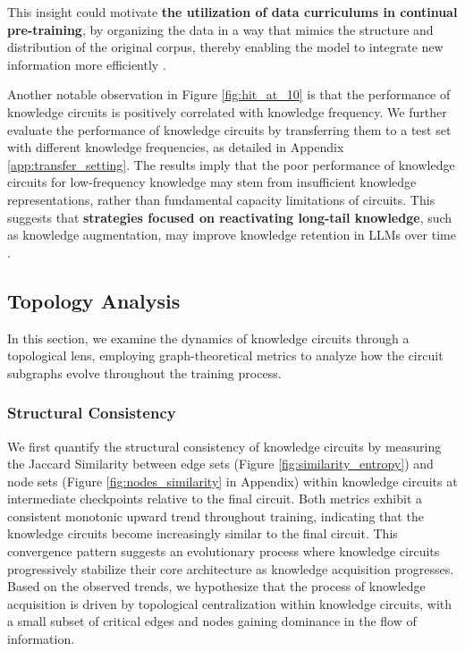 
This insight could motivate \textbf{the utilization of data curriculums in continual pre-training}, by organizing the data in a way that mimics the structure and distribution of the original corpus, thereby enabling the model to integrate new information more efficiently \citep{Yıldız_Ravichandran_Punia_Bethge_Ermis_2024,Parmar_Satheesh_Patwary_Shoeybi_Catanzaro_2024,Chen_Chen_Wang_Zhou_Zhu_Jiang_Min_Zhao_Dou_Mao_2024}.

Another notable observation in Figure \ref{fig:hit_at_10} is that the performance of knowledge circuits is positively correlated with knowledge frequency.
We further evaluate the performance of knowledge circuits by transferring them to a test set with different knowledge frequencies, as detailed in Appendix \ref{app:transfer_setting}.
The results imply that the poor performance of knowledge circuits for low-frequency knowledge may stem from insufficient knowledge representations, rather than fundamental capacity limitations of circuits.
This suggests that \textbf{strategies focused on reactivating long-tail knowledge}, such as knowledge augmentation, may improve knowledge retention in LLMs over time \citep{physics3.1}.

\subsection{Topology Analysis}
\label{sec:topology}

In this section, we examine the dynamics of knowledge circuits through a topological lens, employing graph-theoretical metrics to analyze how the circuit subgraphs evolve throughout the training process.

\subsubsection{Structural Consistency}

We first quantify the structural consistency of knowledge circuits by measuring the Jaccard Similarity between edge sets (Figure \ref{fig:similarity_entropy}) and node sets (Figure \ref{fig:nodes_similarity} in Appendix) within knowledge circuits at intermediate checkpoints relative to the final circuit.
Both metrics exhibit a consistent monotonic upward trend throughout training, indicating that the knowledge circuits become increasingly similar to the final circuit.
This convergence pattern suggests an evolutionary process where knowledge circuits progressively stabilize their core architecture as knowledge acquisition progresses.
Based on the observed trends, we hypothesize that the process of knowledge acquisition is driven by topological centralization within knowledge circuits, with a small subset of critical edges and nodes gaining dominance in the flow of information.

